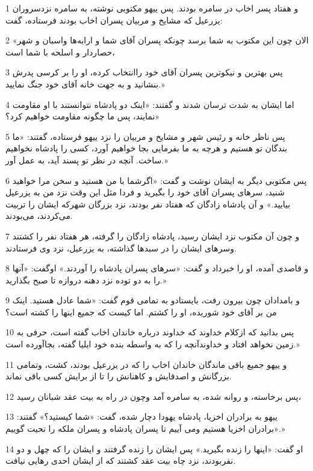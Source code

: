 \par 1 و هفتاد پسر اخاب در سامره بودند. پس ییهو مکتوبی نوشته، به سامره نزدسروران یزرعیل که مشایخ و مربیان پسران اخاب بودند فرستاده، گفت:
\par 2 «الان چون این مکتوب به شما برسد چونکه پسران آقای شما و ارابه‌ها واسبان و شهر حصاردار و اسلحه با شما است،
\par 3 پس بهترین و نیکوترین پسران آقای خود راانتخاب کرده، او را بر کرسی پدرش بنشانید و به جهت خانه آقای خود جنگ نمایید.»
\par 4 اما ایشان به شدت ترسان شدند و گفتند: «اینک دو پادشاه نتوانستند با او مقاومت نمایند، پس ما چگونه مقاومت خواهیم کرد؟»
\par 5 پس ناظر خانه و رئیس شهر و مشایخ و مربیان را نزد ییهو فرستاده، گفتند: «ما بندگان تو هستیم و هر‌چه به ما بفرمایی بجا خواهیم آورد، کسی را پادشاه نخواهیم ساخت. آنچه در نظر تو پسند آید، به عمل آور.»
\par 6 پس مکتوبی دیگر به ایشان نوشت و گفت: «اگرشما با من هستید و سخن مرا خواهید شنید، سرهای پسران آقای خود را بگیرید و فردا مثل این وقت نزد من به یزرعیل بیایید.» و آن پادشاه زادگان که هفتاد نفر بودند، نزد بزرگان شهرکه ایشان را تربیت می‌کردند، می‌بودند.
\par 7 و چون آن مکتوب نزد ایشان رسید، پادشاه زادگان را گرفته، هر هفتاد نفر را کشتند وسرهای ایشان را در سبدها گذاشته، به یزرعیل، نزد وی فرستادند.
\par 8 و قاصدی آمده، او را خبرداد و گفت: «سرهای پسران پادشاه را آوردند.» اوگفت: «آنها را به دو توده نزد دهنه دروازه تا صبح بگذارید.»
\par 9 و بامدادان چون بیرون رفت، بایستادو به تمامی قوم گفت: «شما عادل هستید. اینک من بر آقای خود شوریده، او را کشتم. اما کیست که جمیع اینها را کشته است؟
\par 10 پس بدانید که ازکلام خداوند که خداوند درباره خاندان اخاب گفته است، حرفی به زمین نخواهد افتاد و خداوندآنچه را که به واسطه بنده خود ایلیا گفته، بجاآورده است.»
\par 11 و ییهو جمیع باقی ماندگان خاندان اخاب را که در یزرعیل بودند، کشت، وتمامی بزرگانش و اصدقایش و کاهنانش را تا از برایش کسی باقی نماند.
\par 12 پس برخاسته، و روانه شده، به سامره آمد وچون در راه به بیت عقد شبانان رسید،
\par 13 ییهو به برادران اخزیا، پادشاه یهودا دچار شده، گفت: «شما کیستید؟» گفتند: «برادران اخزیا هستیم ومی آییم تا پسران پادشاه و پسران ملکه را تحیت گوییم.»
\par 14 او گفت: «اینها را زنده بگیرید.» پس ایشان را زنده گرفتند و ایشان را که چهل و دو نفربودند، نزد چاه بیت عقد کشتند که از ایشان احدی رهایی نیافت.
